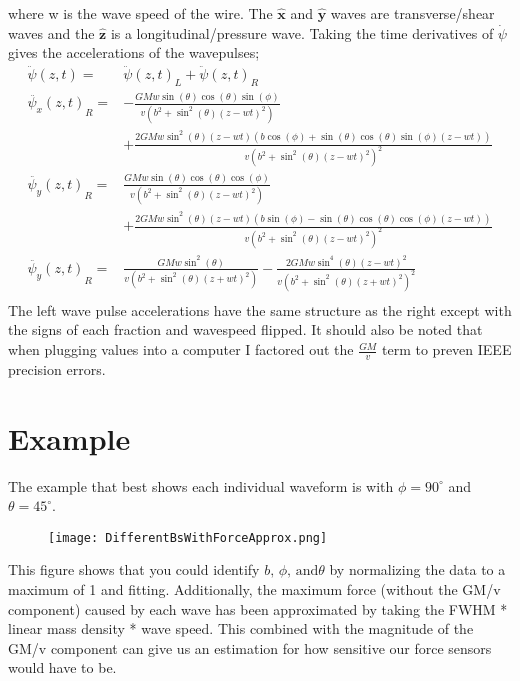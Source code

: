 \documentclass{report}
\begin{document}
where w is the wave speed of the wire. The $\mathbf{\hat x}$ and $\mathbf{\hat y}$ waves are transverse/shear waves and the $\mathbf{\hat z}$ is a longitudinal/pressure wave.
Taking the time derivatives of $\dot{\psi}$ gives the accelerations of the wavepulses;
\begin{align}
    \ddot{\psi} (z, t) =& {\ddot{\psi} (z, t)}_L + {\ddot{\psi} (z, t)}_R\\
    \nonumber {\ddot{\psi_x} (z, t)}_R =& -\frac{G M w \sin (\theta ) \cos (\theta ) \sin (\phi )}{v \left(b^2+\sin ^2(\theta ) {(z - w t)}^2\right) }\\
    & +\frac{2 G M w \sin ^2(\theta ) (z - w t) (b \cos (\phi )+\sin (\theta ) \cos (\theta ) \sin (\phi ) (z - w t))}{v {\left(b^2+\sin ^2(\theta ) {(z - w t)}^2\right)}^2}\\
    \nonumber {\ddot{\psi_y} (z, t)}_R =& \frac{G M w \sin (\theta ) \cos (\theta ) \cos (\phi )}{v \left(b^2+\sin ^2(\theta ) {(z - w t)}^2\right)}\\
    & +\frac{2 G M w \sin ^2(\theta ) (z - w t) (b \sin (\phi )-\sin (\theta ) \cos (\theta ) \cos (\phi ) (z - w t))}{v {\left(b^2+\sin ^2(\theta ) {(z - w t)}^2\right)}^2} \\
    \nonumber {\ddot{\psi_y} (z, t)}_R =& \frac{G M w \sin ^2(\theta )}{v \left(b^2+\sin ^2(\theta ) {(z + w t)}^2\right)} - \frac{2 G M w \sin ^4(\theta ) {(z - w t)}^2}{v {\left(b^2+\sin ^2(\theta ) {(z + w t)}^2\right)}^2}\\
\end{align} 
The left wave pulse accelerations have the same structure as the right except with the signs of each fraction and wavespeed flipped.
It should also be noted that when plugging values into a computer I factored out the $\frac{G M}{v}$ term to preven IEEE precision errors.


\section{Example}
The example that best shows each individual waveform is with $\phi = 90^\circ$ and $\theta = 45^\circ$.

\begin{figure}[H]
    \texttt{[image: DifferentBsWithForceApprox.png]}
\end{figure}

This figure shows that you could identify $b \text{, } \phi \text{, and} \theta$ by normalizing the data to a maximum of 1 and fitting.
Additionally, the maximum force (without the GM/v component) caused by each wave has been approximated by taking the FWHM * linear mass density * wave speed. This combined with 
the magnitude of the GM/v component can give us an estimation for how sensitive our force sensors would have to be.
\end{document}
